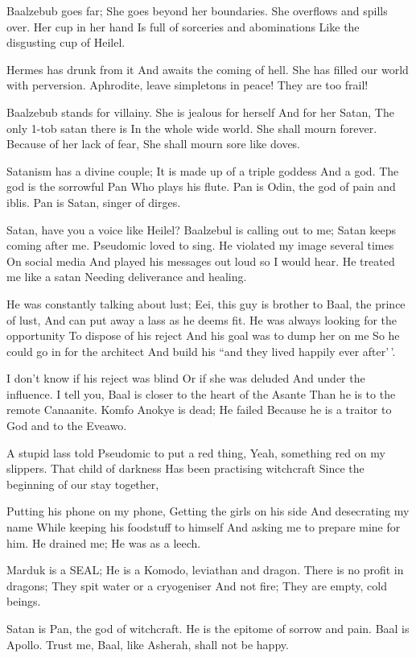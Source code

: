 \documentclass[
]{book}
\begin{document}
Baalzebub goes far;
She goes beyond her boundaries.
She overflows and spills over.
Her cup in her hand
Is full of sorceries and abominations
Like the disgusting cup of Heilel.

Hermes has drunk from it
And awaits the coming of hell.
She has filled our world with perversion.
Aphrodite, leave simpletons in peace!
They are too frail!

Baalzebub stands for villainy.
She is jealous for herself
And for her Satan,
The only 1-tob satan there is
In the whole wide world.
She shall mourn forever.
Because of her lack of fear,
She shall mourn sore like doves.

Satanism has a divine couple;
It is made up of a triple goddess
And a god.
The god is the sorrowful Pan
Who plays his flute.
Pan is Odin, the god of pain and iblis.
Pan is Satan, singer of dirges.

Satan, have you a voice like Heilel?
Baalzebul is calling out to me;
Satan keeps coming after me.
Pseudomic loved to sing.
He violated my image several times
On social media
And played his messages out loud so I would hear.
He treated me like a satan
Needing deliverance and healing.

He was constantly talking about lust;
Eei, this guy is brother to Baal, the prince of lust,
And can put away a lass as he deems fit.
He was always looking for the opportunity
To dispose of his reject
And his goal was to dump her on me
So he could go in for the architect
And build his ``and they lived happily ever after'\,'.

I don't know if his reject was blind
Or if she was deluded
And under the influence.
I tell you, Baal is closer to the heart of the Asante
Than he is to the remote Canaanite.
Komfo Anokye is dead; He failed
Because he is a traitor to God and to the Eveawo.

A stupid lass told Pseudomic to put a red thing,
Yeah, something red on my slippers.
That child of darkness
Has been practising witchcraft
Since the beginning of our stay together,

Putting his phone on my phone,
Getting the girls on his side
And desecrating my name
While keeping his foodstuff to himself
And asking me to prepare mine for him.
He drained me; He was as a leech.

Marduk is a SEAL;
He is a Komodo, leviathan and dragon.
There is no profit in dragons;
They spit water or a cryogeniser
And not fire;
They are empty, cold beings.

Satan is Pan, the god of witchcraft.
He is the epitome of sorrow and pain.
Baal is Apollo.
Trust me, Baal, like Asherah, shall not be happy.
\end{document}
